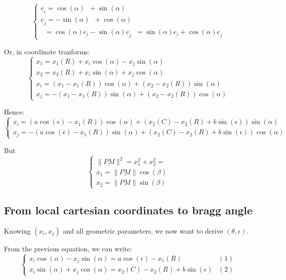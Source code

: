 \documentclass[a4paper,11pt,twoside,titlepage,openright]{book}
\numberwithin{equation}{section}
\newcommand{\ud}[1]{\underline{#1}}
\newcommand{\lt}{\left}
\newcommand{\rt}{\right}
\DeclareMathOperator{\ei}{\underline{e}_1}
\DeclareMathOperator{\et}{\underline{e}_2}
\begin{document}
$$
\lt\{
	\begin{array}{lll}
		\ud{e}_i = \cos(\alpha)\ei + \sin(\alpha)\et\\
		\ud{e}_j = -\sin(\alpha)\ei + \cos(\alpha)\et\\
		\ei = \cos(\alpha)\ud{e_i} - \sin(\alpha)\ud{e}_j
		\et = \sin(\alpha)\ud{e_i} + \cos(\alpha)\ud{e}_j
	\end{array}
\rt.
$$

Or, in coordinate tranforms:
$$
\lt\{
	\begin{array}{lll}
		x_1 = x_1(R) + x_i\cos(\alpha) - x_j\sin(\alpha)\\
		x_2 = x_2(R) + x_i\sin(\alpha) + x_j\cos(\alpha)\\
		x_i = (x_1-x_1(R))\cos(\alpha) + (x_2-x_2(R))\sin(\alpha)\\
		x_j = -(x_1-x_1(R))\sin(\alpha) + (x_2-x_2(R))\cos(\alpha)
	\end{array}
\rt.
$$

Hence:
$$
\lt\{
	\begin{array}{lll}
		x_i = \lt(a\cos(\epsilon)-x_1(R)\rt)\cos(\alpha) + \lt(x_2(C)-x_2(R) + b\sin(\epsilon)\rt)\sin(\alpha)\\
		x_j = -\lt(a\cos(\epsilon)-x_1(R)\rt)\sin(\alpha) + \lt(x_2(C)-x_2(R) + b\sin(\epsilon)\rt)\cos(\alpha)
	\end{array}
\rt.
$$

But
$$
\lt\{
	\begin{array}{lll}
		\|\ud{PM}\|^2 = x_1^2 + x_2^2 = \\
		x_1 = \|\ud{PM}\|\cos(\beta)\\
		x_2 = \|\ud{PM}\|\sin(\beta)
	\end{array}
\rt.
$$



\subsection{From local cartesian coordinates to bragg angle}

Knowing $(x_i, x_j)$ and all geometric parameters, we now want to derive $(\theta, \epsilon)$.

From the previous equation, we can write:
$$
\lt\{
	\begin{array}{lll}
        x_i\cos(\alpha) - x_j\sin(\alpha) = a\cos(\epsilon)-x_1(R) & (1)\\
        x_i\sin(\alpha) + x_j\cos(\alpha) = x_2(C)-x_2(R) + b\sin(\epsilon) &
        (2)
	\end{array}
\rt.
$$
\end{document}
